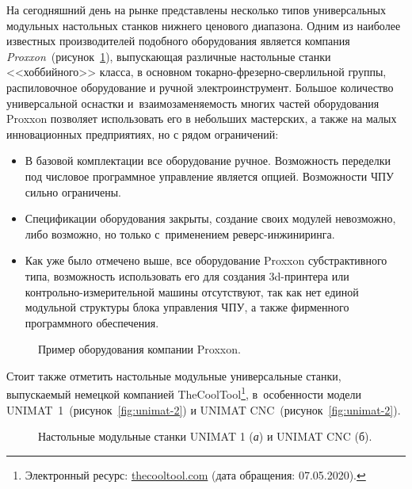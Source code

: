На сегодняшний день на рынке представлены несколько типов универсальных модульных настольных станков нижнего ценового диапазона. Одним из наиболее известных производителей подобного оборудования является компания \textit{Proxxon}~(рисунок~\cref{fig:proxxon}), выпускающая различные настольные станки <<хоббийного>> класса, в основном токарно-фрезерно-сверлильной группы, распиловочное оборудование и ручной электроинструмент. Большое количество универсальной оснастки и~взаимозаменяемость многих частей оборудования Proxxon позволяет использовать его в небольших мастерских, а также на малых инновационных предприятиях, но с рядом ограничений:

\begin{itemize}
	\item В базовой комплектации все оборудование ручное. Возможность переделки под числовое программное управление является опцией. Возможности ЧПУ сильно ограничены.
	\item Спецификации оборудования закрыты, создание своих модулей невозможно, либо возможно, но только с~применением реверс-инжиниринга.
	\item Как уже было отмечено выше, все оборудование Proxxon субстрактивного типа, возможность использовать его для создания 3d-принтера или контрольно-измерительной машины отсутствуют, так как нет единой модульной структуры блока управления ЧПУ, а также фирменного программного обеспечения.	
\end{itemize}

\begin{figure}[ht]
	\caption{Пример оборудования компании Proxxon.}\label{fig:proxxon}
\end{figure}

Стоит также отметить настольные модульные универсальные станки, выпускаемый немецкой компанией TheCoolTool\footnote{Электронный ресурс: {\small\url{thecooltool.com}} (дата обращения: 07.05.2020).}, в~особенности модели UNIMAT~1~(рисунок~\cref{fig:unimat-2}) и UNIMAT CNC~(рисунок~\cref{fig:unimat-2}).

\begin{figure}[ht]
	\caption{Настольные модульные станки UNIMAT 1 (\textit{а}) и UNIMAT CNC (б).}\label{fig:unimat}
\end{figure}

